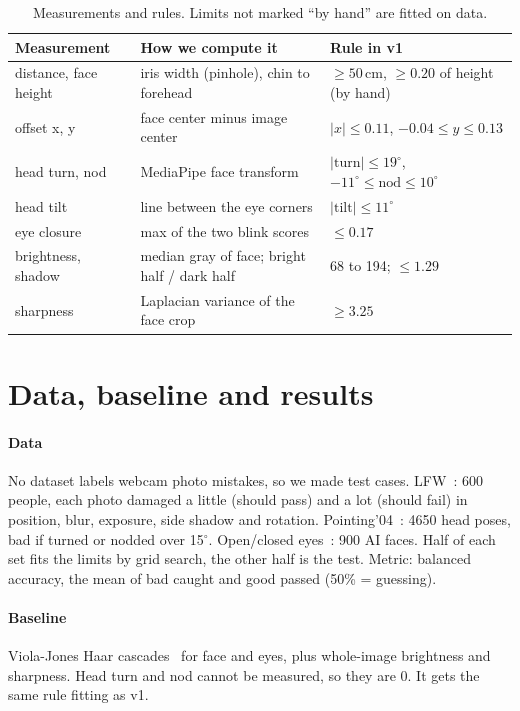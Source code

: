 \documentclass[11pt]{article}
\begin{document}
\begin{table}[h]
\centering
\footnotesize
\begin{tabular}{@{}lll@{}}
\toprule
Measurement & How we compute it & Rule in v1 \\
\midrule
distance, face height & iris width (pinhole), chin to forehead & $\ge 50$\,cm, $\ge 0.20$ of height (by hand) \\
offset x, y & face center minus image center & $|x| \le 0.11$, $-0.04 \le y \le 0.13$ \\
head turn, nod & MediaPipe face transform & $|\text{turn}| \le 19^\circ$, $-11^\circ \le \text{nod} \le 10^\circ$ \\
head tilt & line between the eye corners & $|\text{tilt}| \le 11^\circ$ \\
eye closure & max of the two blink scores & $\le 0.17$ \\
brightness, shadow & median gray of face; bright half / dark half & 68 to 194; $\le 1.29$ \\
sharpness & Laplacian variance of the face crop & $\ge 3.25$ \\
\bottomrule
\end{tabular}
\caption{Measurements and rules. Limits not marked ``by hand'' are fitted on data.}
\label{tab:rules}
\end{table}

\vspace{-1.5em}
\section{Data, baseline and results}

\paragraph{Data} No dataset labels webcam photo mistakes, so we made test cases. LFW~\cite{lfw}: 600 people, each photo damaged a little (should pass) and a lot (should fail) in position, blur, exposure, side shadow and rotation. Pointing'04~\cite{pointing04}: 4650 head poses, bad if turned or nodded over 15$^\circ$. Open/closed eyes~\cite{eyesdata}: 900 AI faces. Half of each set fits the limits by grid search, the other half is the test. Metric: balanced accuracy, the mean of bad caught and good passed (50\% = guessing).

\paragraph{Baseline} Viola-Jones Haar cascades~\cite{viola2001} for face and eyes, plus whole-image brightness and sharpness. Head turn and nod cannot be measured, so they are 0. It gets the same rule fitting as v1.
\end{document}
